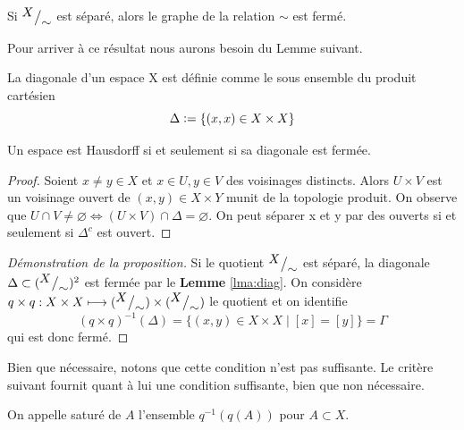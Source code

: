 \documentclass[main.tex]{subfiles}
\begin{document}
	\begin{prop}
		Si ${^{\textstyle X}\big/_{\textstyle \sim}}$ est séparé, alors le graphe de la relation  $\sim$ est fermé.
	\end{prop}
	Pour arriver à ce résultat nous aurons besoin du Lemme suivant.
	\begin{definition}[Diagonale]
		La diagonale d'un espace X est définie comme le sous ensemble du produit cartésien
	\[\Delta \vcentcolon= \{(x,x) \in X \times X\}\]
	\end{definition}
	\begin{lemma}
		\label{lma:diag}
		Un espace est Hausdorff si et seulement si sa diagonale est fermée.
	\end{lemma}
	\begin{proof}
		Soient $x \neq y \in X$ et  $x \in U, y \in V$ des voisinages distincts. Alors  $U\times V$ est un voisinage ouvert de  $(x,y) \in X\times Y$ munit de la topologie produit. On observe que  $U\cap V \neq \varnothing \iff (U\times V) \cap \Delta = \varnothing$. On peut séparer x et y par des ouverts si et seulement si $\Delta^c$ est ouvert.
	\end{proof}
	\begin{proof}[Démonstration de la proposition]
		Si le quotient ${^{\textstyle X}\big/_{\textstyle \sim}}$ est séparé, la diagonale $\Delta \subset ({^{\textstyle X}\big/_{\textstyle \sim}})^2$ est fermée par le \textbf{Lemme} \ref{lma:diag}. On considère $q\times q : X \times X \longmapsto ({^{\textstyle X}\big/_{\textstyle \sim}}) \times ({^{\textstyle X}\big/_{\textstyle \sim}})$ le quotient et on identifie \[
		{(q \times q)}^{-1}(\Delta) = \{(x,y) \in X \times X \;|\; [x] = [y]\} = \Gamma 
		\] qui est donc fermé.	
	\end{proof}
	Bien que nécessaire, notons que cette condition n'est pas suffisante. Le critère suivant fournit quant à lui une condition suffisante, bien que non nécessaire. 
	\begin{definition}[Saturé]
		On appelle saturé de $A$ l'ensemble $q^{-1}(q(A))$ pour  $A \subset X$.
	\end{definition}
\end{document}
